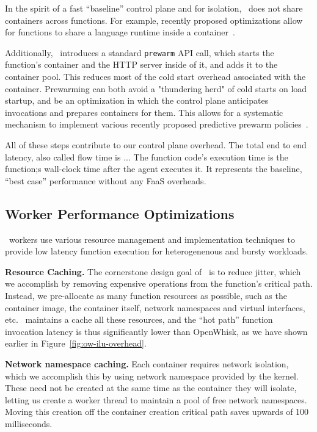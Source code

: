 In the spirit of a fast ``baseline'' control plane and for isolation, \sysname~does not share containers across functions.
For example, recently proposed optimizations allow for functions to share a language runtime inside a container~\cite{}. 

Additionally, \sysname~introduces a standard \texttt{prewarm}  API call, which starts the function's container and the HTTP server inside of it, and adds it to the container pool.
This reduces most of the cold start overhead associated with the container.
Prewarming can both avoid a "thundering herd" of cold starts on load startup, and be an optimization in which the control plane anticipates invocations and prepares containers for them. 
This allows for a systematic mechanism to implement various recently proposed predictive prewarm policies~\cite{zhou2022aquatope, icebreaker, shahrad,..}. 


All of these steps contribute to our control plane overhead.
The total end to end latency, also called flow time is ...
The function code's execution time is the function;s wall-clock time after the agent executes it. It represents the baseline, ``best case'' performance without any FaaS overheads. 


\subsection{Worker Performance Optimizations}

\sysname~workers use various resource management and implementation techniques to provide low latency function execution for heterogenenous and bursty workloads.

\noindent \textbf{Resource Caching.}
The cornerstone design goal of \sysname~is to reduce jitter, which we accomplish by removing expensive operations from the function's critical path.
Instead, we pre-allocate as many function resources as possible, such as the container image, the container itself, network namespaces and virtual interfaces, etc.
\sysname~maintains a cache all these resources, and the ``hot path'' function invocation latency is thus significantly lower than OpenWhisk, as we have shown earlier in Figure~\ref{fig:ow-ilu-overhead}.


\textbf{Network namespace caching.}
Each container requires network isolation, which we accomplish this by using network namespace provided by the kernel. 
These need not be created at the same time as the container they will isolate, letting us create a worker thread to maintain a pool of free network namespaces.
Moving this creation off the container creation critical path saves upwards of 100 milliseconds.

